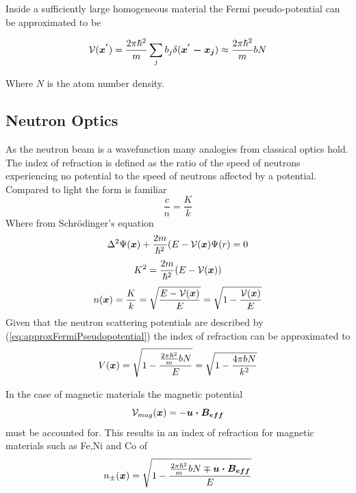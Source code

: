 Inside a sufficiently large homogeneous material the Fermi pseudo-potential can be approximated to be 

\begin{equation}
 \mathcal{V}(\mbox{\boldmath$x^{'}$})  = \frac{2\pi\hbar^2}{m}\sum\limits_{j} b_j \delta(\mbox{\boldmath$x^{'}-x_{j}$}) \approx \frac{2\pi\hbar^2}{m}bN 
\label{eq:approxFermiPseudopotential}
\end{equation}

Where $N$ is the atom number density. 
\subsection{Neutron Optics}
As the neutron beam is a wavefunction many analogies from classical optics hold. The index of refraction is defined as the ratio of the speed of neutrons experiencing no potential to the speed of neutrons affected by a potential. Compared to light the form is familiar 
$$ \frac{c}{n} = \frac{K}{k}$$
Where from Schrödinger's equation
$$\Delta^2\Psi(\mbox{\boldmath$x$}) + \frac{2m}{\hbar^2}(E-\mathcal{V}(\mbox{\boldmath$x$})\Psi(r) = 0 $$ 
\begin{equation}
\label{eq:K}
K^2 = \frac{2m}{\hbar^2}(E-\mathcal{V}(\mbox{\boldmath$x$}))
\end{equation}
\begin{equation}
\label{eq:NinPotential}
n(\mbox{\boldmath$x$}) = \frac{K}{k} = \sqrt{\frac{E-\mathcal{V}(\mbox{\boldmath$x$})}{E}}=\sqrt{1-\frac{\mathcal{V}(\mbox{\boldmath$x$})}{E}}
\end{equation}
Given that the neutron scattering potentials are described by (\ref{eq:approxFermiPseudopotential}) the index of refraction can be approximated to 
\begin{equation}
V(\mbox{\boldmath$x$}) = \sqrt{1-\frac{\frac{2\pi\hbar^2}{m}bN}{E}}= \sqrt{1 - \frac{4\pi bN}{k^2}}
\label{eq:indexofrefraction}
\end{equation}

In the case of magnetic materials the magnetic potential
\begin{equation*}
\mathcal{V}_{mag}(\mbox{\boldmath$x$})=-\mbox{\boldmath$u \cdot B_{eff}$}
\end{equation*}
 must be accounted for. This results in an index of refraction for magnetic materials such as Fe,Ni and Co of 
\begin{equation}
n_{\pm}(\mbox{\boldmath$x$})= \sqrt{1-\frac{\frac{2\pi\hbar^2}{m}bN \mp \mbox{\boldmath$u \cdot B_{eff}$}}{E}}
\label{eq:nucleurIndexofRefraction}
\end{equation}
